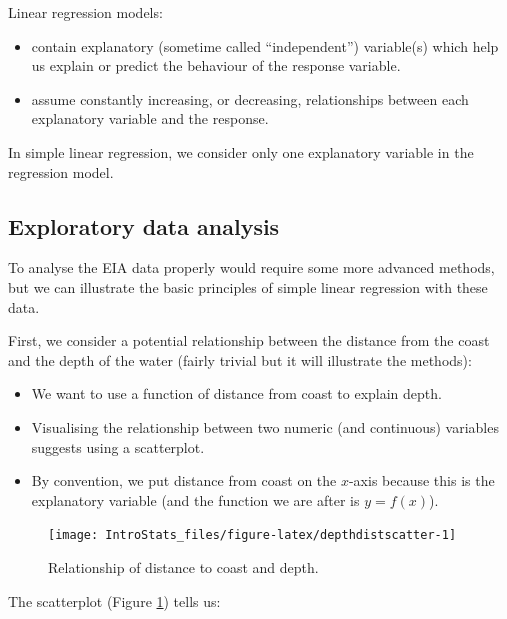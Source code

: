 \documentclass[
  oneside]{krantz}
\providecommand{\tightlist}{%
  \setlength{\itemsep}{0pt}\setlength{\parskip}{0pt}}
\begin{document}
Linear regression models:

\begin{itemize}
\tightlist
\item
  contain explanatory (sometime called ``independent'') variable(s) which help us explain or predict the behaviour of the response variable.
\item
  assume constantly increasing, or decreasing, relationships between each explanatory variable and the response.
\end{itemize}

In simple linear regression, we consider only one explanatory variable in the regression model.

\hypertarget{exploratory-data-analysis}{%
\subsection{Exploratory data analysis}\label{exploratory-data-analysis}}

To analyse the EIA data properly would require some more advanced methods, but we can illustrate the basic principles of simple linear regression with these data.

First, we consider a potential relationship between the distance from the coast and the depth of the water (fairly trivial but it will illustrate the methods):

\begin{itemize}
\tightlist
\item
  We want to use a function of distance from coast to explain depth.
\item
  Visualising the relationship between two numeric (and continuous) variables suggests using a scatterplot.
\item
  By convention, we put distance from coast on the \(x\)-axis because this is the explanatory variable (and the function we are after is \(y=f(x)\)).
\end{itemize}

\begin{figure}

{\centering \texttt{[image: IntroStats\_files/figure-latex/depthdistscatter-1]} 

}

\caption{Relationship of distance to coast and depth.}\label{fig:depthdistscatter}
\end{figure}

The scatterplot (Figure \ref{fig:depthdistscatter}) tells us:
\end{document}
